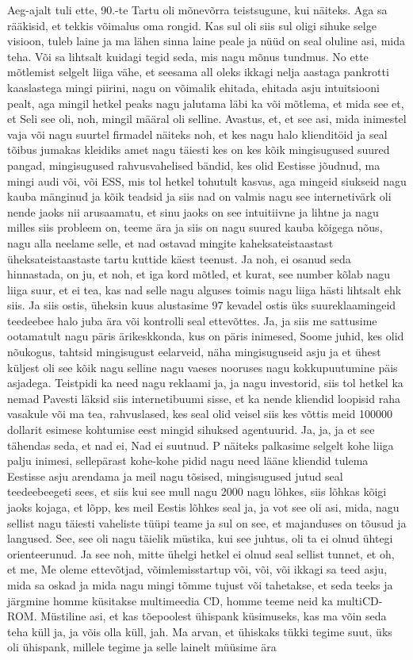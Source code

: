 Aeg-ajalt tuli ette, 90.-te Tartu oli mõnevõrra teistsugune, kui näiteks. Aga sa rääkisid, et tekkis võimalus oma rongid. Kas sul oli siis sul oligi sihuke selge visioon, tuleb laine ja ma lähen sinna laine peale ja nüüd on seal oluline asi, mida teha. Või sa lihtsalt kuidagi tegid seda, mis nagu mõnus tundmus.
No ette mõtlemist selgelt liiga vähe, et seesama all oleks ikkagi nelja aastaga pankrotti kaaslastega mingi piirini, nagu on võimalik ehitada, ehitada asju intuitsiooni pealt, aga mingil hetkel peaks nagu jalutama läbi ka või mõtlema, et mida see et, et Seli see oli, noh, mingil määral oli selline.
Avastus, et, et see asi, mida inimestel vaja või nagu suurtel firmadel näiteks noh, et kes nagu halo klienditöid ja seal tõibus jumakas kleidiks amet nagu täiesti kes on kes kõik mingisugused suured pangad, mingisugused rahvusvahelised bändid, kes olid Eestisse jõudnud, ma mingi audi või, või ESS, mis tol hetkel tohutult kasvas, aga mingeid siukseid nagu kauba mänginud ja kõik teadsid ja siis nad on valmis nagu see internetivärk oli nende jaoks nii arusaamatu, et sinu jaoks on see intuitiivne ja lihtne ja nagu milles siis probleem on, teeme ära ja siis on nagu suured kauba kõigega nõus, nagu alla neelame selle, et nad ostavad mingite kaheksateistaastast üheksateistaastaste tartu kuttide käest teenust. Ja noh, ei osanud seda hinnastada, on ju, et noh, et iga kord mõtled, et kurat, see number kõlab nagu liiga suur, et ei tea, kas nad selle nagu alguses toimis nagu liiga hästi lihtsalt ehk siis. Ja siis ostis, üheksin kuus alustasime 97 kevadel ostis üks suureklaamingeid teedeebee halo juba ära või kontrolli seal ettevõttes. Ja, ja siis me sattusime ootamatult nagu päris ärikeskkonda, kus on päris inimesed, Soome juhid, kes olid nõukogus, tahtsid mingisugust eelarveid, näha mingisuguseid asju ja et ühest küljest oli see kõik nagu selline nagu vaeses nooruses nagu kokkupuutumine päis asjadega. Teistpidi ka need nagu reklaami ja, ja nagu investorid, siis tol hetkel ka nemad Pavesti läksid siis internetibuumi sisse, et ka nende kliendid loopisid raha vasakule või ma tea, rahvuslased, kes seal olid veisel siis kes võttis meid 100000 dollarit esimese kohtumise eest mingid sihuksed agentuurid. Ja, ja, ja et see tähendas seda, et nad ei, Nad ei suutnud. P näiteks palkasime selgelt kohe liiga palju inimesi, sellepärast kohe-kohe pidid nagu need lääne kliendid tulema Eestisse asju arendama ja meil nagu tõsised, mingisugused jutud seal teedeebeegeti sees, et siis kui see mull nagu 2000 nagu lõhkes, siis lõhkas kõigi jaoks kojaga, et lõpp, kes meil Eestis lõhkes seal ja, ja vot see oli asi, mida, nagu sellist nagu täiesti vaheliste tüüpi teame ja sul on see, et majanduses on tõusud ja langused. See, see oli nagu täielik müstika, kui see juhtus, oli ta ei olnud ühtegi orienteerunud. Ja see noh, mitte ühelgi hetkel ei olnud seal sellist tunnet, et oh, et me, Me oleme ettevõtjad, võimlemisstartup või, või, või ikkagi sa teed asju, mida sa oskad ja mida nagu mingi tõmme tujust või tahetakse, et seda teeks ja järgmine homme küsitakse multimeedia CD, homme teeme neid ka multiCD-ROM. Müstiline asi, et kas tõepoolest ühispank küsimuseks, kas ma võin seda teha küll ja, ja võis olla küll, jah. Ma arvan, et ühiskaks tükki tegime suut, üks oli ühispank, millele tegime ja selle lainelt müüsime ära 